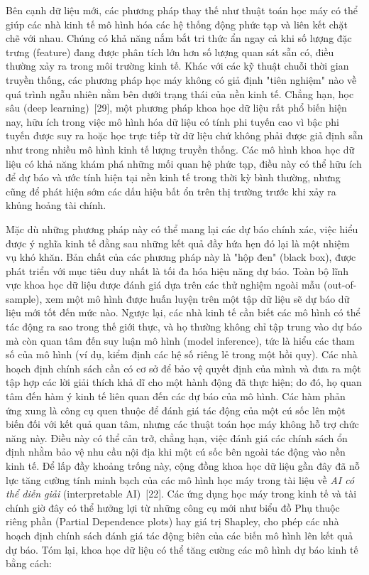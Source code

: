 Bên cạnh dữ liệu mới, các phương pháp thay thế như thuật toán học máy có thể giúp các nhà kinh tế mô hình hóa các hệ thống động phức tạp và liên kết chặt chẽ với nhau. Chúng có khả năng nắm bắt tri thức ẩn ngay cả khi số lượng đặc trưng (feature) đang được phân tích lớn hơn số lượng quan sát sẵn có, điều thường xảy ra trong môi trường kinh tế. Khác với các kỹ thuật chuỗi thời gian truyền thống, các phương pháp học máy không có giả định "tiên nghiệm" nào về quá trình ngẫu nhiên nằm bên dưới trạng thái của nền kinh tế. Chẳng hạn, học sâu (deep learning)~[29], một phương pháp khoa học dữ liệu rất phổ biến hiện nay, hữu ích trong việc mô hình hóa dữ liệu có tính phi tuyến cao vì bậc phi tuyến được suy ra hoặc học trực tiếp từ dữ liệu chứ không phải được giả định sẵn như trong nhiều mô hình kinh tế lượng truyền thống. Các mô hình khoa học dữ liệu có khả năng khám phá những mối quan hệ phức tạp, điều này có thể hữu ích để dự báo và ước tính hiện tại nền kinh tế trong thời kỳ bình thường, nhưng cũng để phát hiện sớm các dấu hiệu bất ổn trên thị trường trước khi xảy ra khủng hoảng tài chính.

Mặc dù những phương pháp này có thể mang lại các dự báo chính xác, việc hiểu được ý nghĩa kinh tế đằng sau những kết quả đầy hứa hẹn đó lại là một nhiệm vụ khó khăn. Bản chất của các phương pháp này là "hộp đen" (black box), được phát triển với mục tiêu duy nhất là tối đa hóa hiệu năng dự báo. Toàn bộ lĩnh vực khoa học dữ liệu được đánh giá dựa trên các thử nghiệm ngoài mẫu (out-of-sample), xem một mô hình được huấn luyện trên một tập dữ liệu sẽ dự báo dữ liệu mới tốt đến mức nào. Ngược lại, các nhà kinh tế cần biết các mô hình có thể tác động ra sao trong thế giới thực, và họ thường không chỉ tập trung vào dự báo mà còn quan tâm đến suy luận mô hình (model inference), tức là hiểu các tham số của mô hình (ví dụ, kiểm định các hệ số riêng lẻ trong một hồi quy). Các nhà hoạch định chính sách cần có cơ sở để bảo vệ quyết định của mình và đưa ra một tập hợp các lời giải thích khả dĩ cho một hành động đã thực hiện; do đó, họ quan tâm đến hàm ý kinh tế liên quan đến các dự báo của mô hình. Các hàm phản ứng xung là công cụ quen thuộc để đánh giá tác động của một cú sốc lên một biến đối với kết quả quan tâm, nhưng các thuật toán học máy không hỗ trợ chức năng này. Điều này có thể cản trở, chẳng hạn, việc đánh giá các chính sách ổn định nhằm bảo vệ nhu cầu nội địa khi một cú sốc bên ngoài tác động vào nền kinh tế. Để lấp đầy khoảng trống này, cộng đồng khoa học dữ liệu gần đây đã nỗ lực tăng cường tính minh bạch của các mô hình học máy trong tài liệu về \emph{AI có thể diễn giải} (interpretable AI)~[22]. Các ứng dụng học máy trong kinh tế và tài chính giờ đây có thể hưởng lợi từ những công cụ mới như biểu đồ Phụ thuộc riêng phần (Partial Dependence plots) hay giá trị Shapley, cho phép các nhà hoạch định chính sách đánh giá tác động biên của các biến mô hình lên kết quả dự báo. Tóm lại, khoa học dữ liệu có thể tăng cường các mô hình dự báo kinh tế bằng cách:

